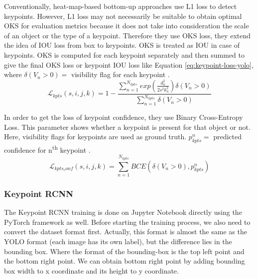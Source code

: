 Conventionally, heat-map-based bottom-up approaches use L1 loss to detect keypoints. However, L1 loss may not necessarily be suitable to obtain optimal OKS for evaluation metrics because it does not take into consideration the scale of an object or the type of a keypoint.
Therefore they use OKS loss, they extend the idea of  IOU loss from box to keypoints. OKS is treated as IOU in case of keypoints. OKS is computed for each keypoint separately and then summed to give the final OKS loss or keypoint IOU loss like Equation \ref{eq:keypoint-loss-yolo},
where $\delta(V_n > 0) =$ visibility flag for each keypoint \parencite{maji2022yolopose}.
\begin{equation}
  \label{eq:keypoint-loss-yolo}
  \mathcal{L}_{kpts}(s,i,j,k) = 1 - \frac{\sum_{n=1}^{N_{kpts}} exp\left( \frac{d_n^2}{2s^2k_n^2} \right) \delta(V_n > 0) }{\sum_{n=1}^{N_{kpts}} \delta(V_n > 0)}
\end{equation}

In order to get the loss of keypoint confidence, they use Binary Cross-Entropy Loss. This parameter shows whether a keypoint is present for that object or not. Here, visibility flags for keypoints are used as ground truth.
$p_{kpts}^n=$ predicted confidence for n\textsuperscript{th} keypoint \parencite{maji2022yolopose}.
\begin{equation}
  \label{eq:keypoint-confident-loss-yolo}
  \mathcal{L}_{kpts_conf}(s,i,j,k) = \sum_{n=1}^{N_{kpts}} BCE(\delta(V_n > 0), p_{kpts}^n)
\end{equation}

\subsubsection{Keypoint RCNN}
\label{subsubsec:training-rcnn}

The Keypoint RCNN training is done on Jupyter Notebook directly using the PyTorch framework as well.
Before starting the training process, we also need to convert the dataset format first.
Actually, this format is almost the same as the YOLO format (each image has its own label), but the difference lies in the bounding box.
Where the format of the bounding-box is the top left point and the bottom right point. We can obtain bottom right point by adding bounding box width to x coordinate and its height to y coordinate.

